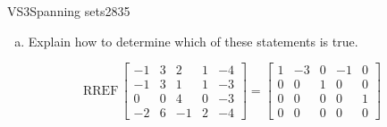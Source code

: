 \begin{exercise}{VS3}{Spanning sets}{2835}
\begin{exerciseStatement}
\begin{enumerate}[(a)]
\begin{itemize}
 The set of vectors \(\left\{ \left[\begin{array}{c}
-1 \\
-1 \\
0 \\
-2
\end{array}\right] , \left[\begin{array}{c}
3 \\
3 \\
0 \\
6
\end{array}\right] , \left[\begin{array}{c}
2 \\
1 \\
4 \\
-1
\end{array}\right] , \left[\begin{array}{c}
1 \\
1 \\
0 \\
2
\end{array}\right] , \left[\begin{array}{c}
-4 \\
-3 \\
-3 \\
-4
\end{array}\right] \right\}\) does \textbf{not} span \(\mathbb R^4\). 

 
\end{itemize}

     
\item  

 Explain how to determine which of these statements is true. 

 
\end{enumerate}

     \end{exerciseStatement}
 \begin{exerciseAnswer} 

 \[
\mathrm{RREF}\, \left[\begin{array}{ccccc}
-1 & 3 & 2 & 1 & -4 \\
-1 & 3 & 1 & 1 & -3 \\
0 & 0 & 4 & 0 & -3 \\
-2 & 6 & -1 & 2 & -4
\end{array}\right] = \left[\begin{array}{ccccc}
1 & -3 & 0 & -1 & 0 \\
0 & 0 & 1 & 0 & 0 \\
0 & 0 & 0 & 0 & 1 \\
0 & 0 & 0 & 0 & 0
\end{array}\right]
            \] 


\end{exerciseAnswer}
\end{exercise}
